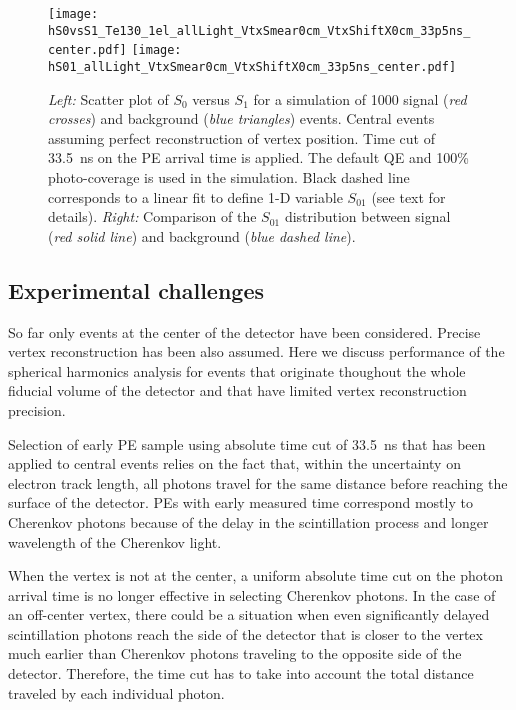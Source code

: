 \begin{figure*}[h]
  \centering
  \texttt{[image: hS0vsS1\_Te130\_1el\_allLight\_VtxSmear0cm\_VtxShiftX0cm\_33p5ns\_center.pdf]}
  \texttt{[image: hS01\_allLight\_VtxSmear0cm\_VtxShiftX0cm\_33p5ns\_center.pdf]}
  \caption{\emph{Left:} Scatter plot of $S_0$ versus $S_1$ for a simulation of 1000 signal (\emph{red crosses}) and background 
    (\emph{blue triangles}) events.
    Central events assuming perfect reconstruction of vertex position. Time cut of 33.5~ns on the PE arrival time is
    applied. The default QE and 100\% photo-coverage is used in the simulation.
    Black dashed line corresponds to a linear fit to define 1-D variable $S_{01}$ (see text for details).
    \emph{Right:} Comparison of the $S_{01}$ distribution between signal (\emph{red solid line}) and background (\emph{blue dashed line}).}
\label{fig:SL_Te_33p5ns_center}
\end{figure*}



\subsection{Experimental challenges}

So far only events at the center of the detector have been considered. Precise vertex reconstruction has been also assumed. 
Here we discuss performance of the spherical harmonics analysis for events that originate thoughout the whole fiducial volume
of the detector and that have limited vertex reconstruction precision.

Selection of early PE sample using absolute time cut of 33.5~ns that has been applied to central events relies on the fact that, 
within the uncertainty on electron track length, all photons travel for the same distance before reaching the surface of the detector. 
PEs with early measured time correspond mostly to Cherenkov photons because of the delay in the scintillation process and longer 
wavelength of the Cherenkov light. 

When the vertex is not at the center, a uniform absolute time cut on the photon arrival time is no longer effective in selecting 
Cherenkov photons. In the case of an off-center vertex, there could be a situation when even significantly delayed scintillation photons 
reach the side of the detector that is closer to the vertex much earlier than Cherenkov photons traveling to the opposite side of the 
detector. Therefore, the time cut has to take into account the total distance traveled by each individual photon.

